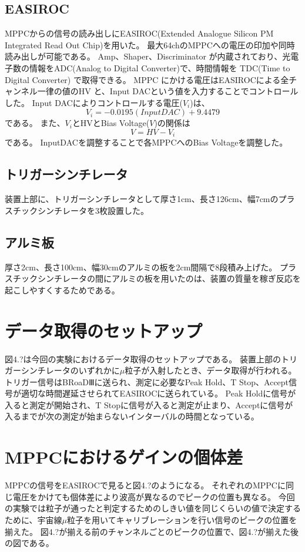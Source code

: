 \subsection{EASIROC}
MPPCからの信号の読み出しにEASIROC(Extended Analogue Silicon PM Integrated Read Out Chip)を用いた。
最大64chのMPPCへの電圧の印加や同時読み出しが可能である。
Amp、Shaper、Discriminator が内蔵されており、光電子数の情報をADC(Analog to Digital Converter)で、時間情報を TDC(Time to Digital Converter) で取得できる。
MPPC にかける電圧はEASIROCによる全チャンネル一律の値のHV と、Input DACという値を入力することでコントロールした。
Input DACによりコントロールする電圧($V_i$)は、
\begin{equation}
    V_i = -0.0195(InputDAC) + 9.4479
\end{equation}
である。
また、$V_i$とHVとBias Voltage($V$)の関係は
\begin{equation}
    V = HV - V_i
\end{equation}
である。
InputDACを調整することで各MPPCへのBias Voltageを調整した。

\subsection{トリガーシンチレータ}
装置上部に、トリガーシンチレータとして厚さ1cm、長さ126cm、幅7cmのプラスチックシンチレータを3枚設置した。

\subsection{アルミ板}
厚さ2cm、長さ100cm、幅30cmのアルミの板を2cm間隔で8段積み上げた。
プラスチックシンチレータの間にアルミの板を用いたのは、装置の質量を稼ぎ反応を起こしやすくするためである。

\section{データ取得のセットアップ}
図4.?は今回の実験におけるデータ取得のセットアップである。
装置上部のトリガーシンチレータのいずれかに$\mu$粒子が入射したとき、データ取得が行われる。
トリガー信号はBRoaDⅢに送られ、測定に必要なPeak Hold、T Stop、Accept信号が適切な時間遅延させられてEASIROCに送られている。
Peak Holdに信号が入ると測定が開始され、T Stopに信号が入ると測定が止まり、Acceptに信号が入るまでが次の測定が始まらないインターバルの時間となっている。

\section{MPPCにおけるゲインの個体差}
MPPCの信号をEASIROCで見ると図4.?のようになる。
それぞれのMPPCに同じ電圧をかけても個体差により波高が異なるのでピークの位置も異なる。
今回の実験では粒子が通ったと判定するためのしきい値を同じくらいの値で決定するために、宇宙線$\mu$粒子を用いてキャリブレーションを行い信号のピークの位置を揃えた。
図4.?が揃える前のチャンネルごとのピークの位置で、図4.?が揃えた後の図である。
